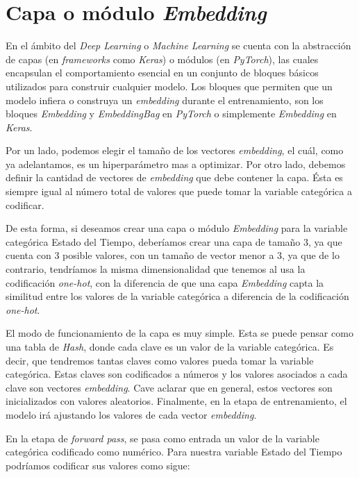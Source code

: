 \documentclass[11pt,a4paper,twoside]{thesis}
\begin{document}
\section{Capa o módulo \textit{Embedding}}

En el ámbito del \textit{Deep Learning} o \textit{Machine Learning} se cuenta
con la abstracción de capas (en \textit{frameworks} como \textit{Keras}) o
módulos (en \textit{PyTorch}), las cuales encapsulan el comportamiento esencial
en un conjunto de bloques básicos utilizados para construir cualquier modelo.
Los bloques que permiten que un modelo infiera o construya un
\textit{embedding} durante el entrenamiento, son los bloques \textit{Embedding}
y \textit{EmbeddingBag} en \textit{PyTorch} o simplemente \textit{Embedding} en
\textit{Keras}.

Por un lado, podemos elegir el tamaño de los vectores \textit{embedding}, el
cuál, como ya adelantamos, es un hiperparámetro mas a optimizar. Por otro
lado, debemos definir la cantidad de vectores de \textit{embedding} que debe
contener la capa. Ésta es siempre igual al número total de valores que puede
tomar la variable categórica a codificar.

De esta forma, si deseamos crear una capa o módulo \textit{Embedding} para la
variable categórica Estado del Tiempo, deberíamos crear una capa de tamaño 3,
ya que cuenta con 3 posible valores, con un tamaño de vector menor a 3, ya que
de lo contrario, tendríamos la misma dimensionalidad que tenemos al usa la
codificación \textit{one-hot}, con la diferencia de que una capa
\textit{Embedding} capta la similitud entre los valores de la variable
categórica a diferencia de la codificación \textit{one-hot}.

El modo de funcionamiento de la capa es muy simple. Esta se puede pensar como
una tabla de \textit{Hash}, donde cada clave es un valor de la variable
categórica. Es decir, que tendremos tantas claves como valores pueda tomar la
variable categórica. Estas claves son codificados a números y los valores
asociados a cada clave son vectores \textit{embedding}. Cave aclarar que en
general, estos vectores son inicializados con valores aleatorios. Finalmente,
en la etapa de entrenamiento, el modelo irá ajustando los valores de cada
vector \textit{embedding}.

\clearpage

En la etapa de \textit{forward pass}, se pasa como entrada un valor de la
variable categórica codificado como numérico. Para nuestra variable Estado del
Tiempo podríamos codificar sus valores como sigue:
\end{document}
